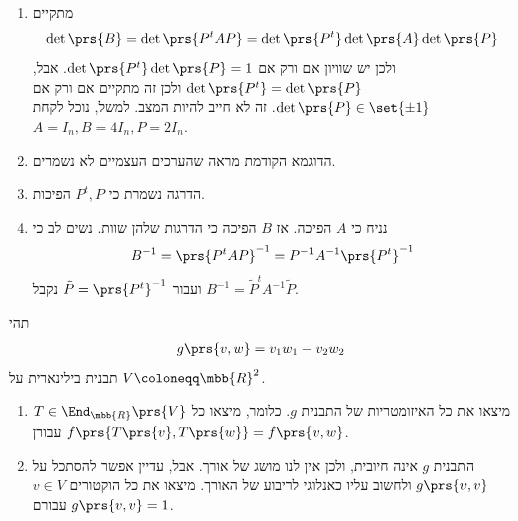\documentclass[a4paper,10pt,twoside,openany]{book}
\begin{document}
\begin{solution}
\begin{enumerate}
\item מתקיים
\[\det\prs{B} = \det\prs{P^t A P} = \det\prs{P^t} \det\prs{A} \det\prs{P}\]
ולכן יש שוויון אם ורק אם
$\det\prs{P^t} \det\prs{P} = 1$.
אבל,
$\det\prs{P^t} = \det\prs{P}$
ולכן זה מתקיים אם ורק אם
$\det\prs{P} \in \set{\pm 1}$.
זה לא חייב להיות המצב. למשל, נוכל לקחת
$A = I_n, B = 4I_n, P = 2I_n$.

\item הדוגמא הקודמת מראה שהערכים העצמיים לא נשמרים.

\item הדרגה נשמרת כי
$P^t, P$
הפיכות.

\item נניח כי
$A$
הפיכה. אז
$B$
הפיכה כי הדרגות שלהן שוות.
נשים לב כי
\[B^{-1} = \prs{P^t A P}^{-1} = P^{-1} A^{-1} \prs{P^t}^{-1}\]
ועבור
$\tilde{P} = \prs{P^t}^{-1}$
נקבל
$B^{-1} = \tilde{P}^t A^{-1} \tilde{P}$.
\end{enumerate}
\end{solution}

\begin{exercisechap}
תהי
\begin{align*}
    g\prs{v,w} = v_1 w_1 - v_2 w_2
\end{align*}
תבנית בילינארית על
$V \coloneqq \mbb{R}^2$.

\begin{enumerate}
    \item מיצאו את כל האיזומטריות
    של התבנית
    $g$.
    כלומר, מיצאו כל
    $T \in \End_{\mbb{R}}\prs{V}$
    עבורן
    $f\prs{T\prs{v}, T\prs{w}} = f\prs{v,w}$.
    
    \item התבנית
    $g$
    אינה חיובית, ולכן אין לנו מושג של אורך. אבל, עדיין אפשר להסתכל על
    $g\prs{v,v}$
    ולחשוב עליו כאנלוגי לריבוע של האורך.
    מיצאו את כל הוקטורים
    $v \in V$
    עבורם
    $g\prs{v,v} = 1$.
\end{enumerate}
\end{exercisechap}
\end{document}
